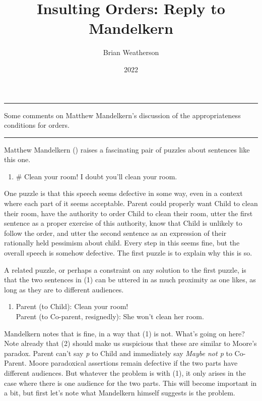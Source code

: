 \documentclass[
  10pt,
  letterpaper,
  DIV=11,
  numbers=noendperiod,
  twoside]{scrartcl}
\title{Insulting Orders: Reply to Mandelkern}
\author{Brian Weatherson}
\date{2022}
\providecommand{\tightlist}{%
  \setlength{\itemsep}{0pt}\setlength{\parskip}{0pt}}\usepackage{longtable,booktabs,array}
\renewenvironment{abstract}
 {\vspace{-1.25cm}
 \quotation\small\noindent\rule{\linewidth}{.5pt}\par\smallskip
 \noindent }
 {\par\noindent\rule{\linewidth}{.5pt}\endquotation}
\begin{document}
\maketitle
\begin{abstract}
Some comments on Matthew Mandelkern's discussion of the appropriateness
conditions for orders.
\end{abstract}


Matthew Mandelkern () raises a
fascinating pair of puzzles about sentences like this one.

\begin{enumerate}
\def\labelenumi{(\arabic{enumi})}
\tightlist
\item
  \# Clean your room! I doubt you'll clean your room.
\end{enumerate}

One puzzle is that this speech seems defective in some way, even in a
context where each part of it seems acceptable. Parent could properly
want Child to clean their room, have the authority to order Child to
clean their room, utter the first sentence as a proper exercise of this
authority, know that Child is unlikely to follow the order, and utter
the second sentence as an expression of their rationally held pessimism
about child. Every step in this seems fine, but the overall speech is
somehow defective. The first puzzle is to explain why this is so.

A related puzzle, or perhaps a constraint on any solution to the first
puzzle, is that the two sentences in (1) can be uttered in as much
proximity as one likes, as long as they are to different audiences.

\begin{enumerate}
\def\labelenumi{(\arabic{enumi})}
\setcounter{enumi}{1}
\tightlist
\item
  Parent (to Child): Clean your room!\\
  Parent (to Co-parent, resignedly): She won't clean her room.
\end{enumerate}

Mandelkern notes that is fine, in a way that (1) is not. What's going on
here? Note already that (2) should make us suspicious that these are
similar to Moore's paradox. Parent can't say \emph{p} to Child and
immediately say \emph{Maybe not p} to Co-Parent. Moore paradoxical
assertions remain defective if the two parts have different audiences.
But whatever the problem is with (1), it only arises in the case where
there is one audience for the two parts. This will become important in a
bit, but first let's note what Mandelkern himself suggests is the
problem.
\end{document}
